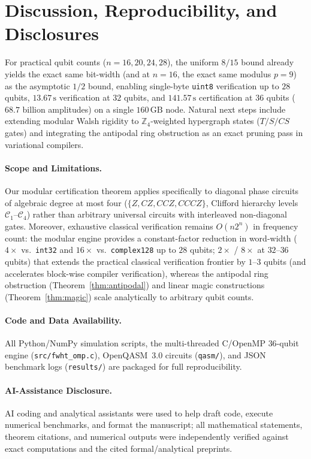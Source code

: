 \documentclass[11pt,a4paper]{article}
\newcommand{\Z}{\mathbb{Z}}
\begin{document}
\section{Discussion, Reproducibility, and Disclosures}
For practical qubit counts ($n=16, 20, 24, 28$), the uniform $8/15$ bound already yields the exact same bit-width (and at $n=16$, the exact same modulus $p=9$) as the asymptotic $1/2$ bound, enabling single-byte \texttt{uint8} verification up to $28$ qubits, $13.67\,\text{s}$ verification at $32$ qubits, and $141.57\,\text{s}$ certification at $36$ qubits ($68.7$ billion amplitudes) on a single $160\,\text{GB}$ node. Natural next steps include extending modular Walsh rigidity to $\Z_4$-weighted hypergraph states ($T/S/CS$ gates) and integrating the antipodal ring obstruction as an exact pruning pass in variational compilers.

\paragraph{Scope and Limitations.}
Our modular certification theorem applies specifically to diagonal phase circuits of algebraic degree at most four ($\{Z, CZ, CCZ, CCCZ\}$, Clifford hierarchy levels $\mathcal{C}_1$--$\mathcal{C}_4$) rather than arbitrary universal circuits with interleaved non-diagonal gates. Moreover, exhaustive classical verification remains $O(n 2^n)$ in frequency count: the modular engine provides a constant-factor reduction in word-width ($4\times$ vs.\ \texttt{int32} and $16\times$ vs.\ \texttt{complex128} up to $28$ qubits; $2\times$ / $8\times$ at $32$--$36$ qubits) that extends the practical classical verification frontier by $1$--$3$ qubits (and accelerates block-wise compiler verification), whereas the antipodal ring obstruction (Theorem~\ref{thm:antipodal}) and linear magic constructions (Theorem~\ref{thm:magic}) scale analytically to arbitrary qubit counts.

\paragraph{Code and Data Availability.}
All Python/NumPy simulation scripts, the multi-threaded C/OpenMP $36$-qubit engine (\texttt{src/fwht\_omp.c}), OpenQASM~3.0 circuits (\texttt{qasm/}), and JSON benchmark logs (\texttt{results/}) are packaged for full reproducibility.

\paragraph{AI-Assistance Disclosure.}
AI coding and analytical assistants were used to help draft code, execute numerical benchmarks, and format the manuscript; all mathematical statements, theorem citations, and numerical outputs were independently verified against exact computations and the cited formal/analytical preprints.
\end{document}
